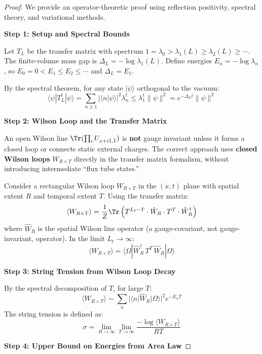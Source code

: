 \begin{proof}
We provide an operator-theoretic proof using reflection positivity, 
spectral theory, and variational methods.

\textbf{Step 1: Setup and Spectral Bounds}

Let $T_L$ be the transfer matrix with spectrum $1 = \lambda_0 > \lambda_1(L) \geq \lambda_2(L) \geq \cdots$.
The finite-volume mass gap is $\Delta_L = -\log\lambda_1(L)$. Define energies $E_n = -\log\lambda_n$, 
so $E_0 = 0 < E_1 \leq E_2 \leq \cdots$ and $\Delta_L = E_1$.

By the spectral theorem, for any state $|\psi\rangle$ orthogonal to the vacuum:
\[
\langle \psi | T_L^t | \psi \rangle = \sum_{n \geq 1} |\langle n | \psi \rangle|^2 \lambda_n^t
\leq \lambda_1^t \|\psi\|^2 = e^{-\Delta_L t} \|\psi\|^2
\]

\textbf{Step 2: Wilson Loop and the Transfer Matrix}

\begin{tcolorbox}[colback=yellow!5, colframe=yellow!75!black, title=\textbf{Gauge Invariance Note}]
An open Wilson line $\Tr(\prod_i U_{x+i\hat{1}, \hat{1}})$ is \textbf{not} 
gauge invariant unless it forms a closed loop or connects static external charges.
The correct approach uses \textbf{closed Wilson loops} $W_{R \times T}$ directly 
in the transfer matrix formalism, without introducing intermediate ``flux tube states.''
\end{tcolorbox}

Consider a rectangular Wilson loop $W_{R \times T}$ in the $(x, t)$ plane with 
spatial extent $R$ and temporal extent $T$. Using the transfer matrix:
\[
\langle W_{R \times T} \rangle = \frac{1}{Z} \Tr\left(T^{L_t - T} \cdot \hat{W}_R \cdot T^T \cdot \hat{W}_R^\dagger\right)
\]
where $\hat{W}_R$ is the spatial Wilson line operator (a gauge-covariant, not 
gauge-invariant, operator). In the limit $L_t \to \infty$:
\[
\langle W_{R \times T} \rangle = \langle \Omega | \hat{W}_R^\dagger \, T^T \, \hat{W}_R | \Omega \rangle
\]

\textbf{Step 3: String Tension from Wilson Loop Decay}

By the spectral decomposition of $T$, for large $T$:
\[
\langle W_{R \times T} \rangle \sim \sum_n |\langle n | \hat{W}_R | \Omega \rangle|^2 e^{-E_n T}
\]
The string tension is defined as:
\[
\sigma = \lim_{R \to \infty} \lim_{T \to \infty} \frac{-\log\langle W_{R \times T}\rangle}{RT}
\]

\textbf{Step 4: Upper Bound on Energies from Area Law}


\end{proof}
